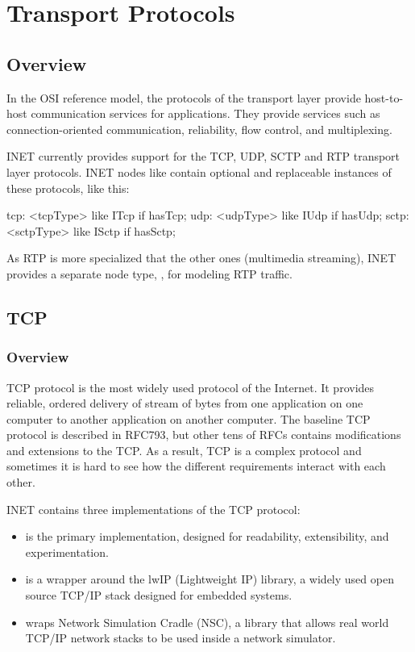 \chapter{Transport Protocols}
\label{cha:transport-protocols}

\section{Overview}
\label{sec:transport:overview}

In the OSI reference model, the protocols of the transport layer provide
host-to-host communication services for applications. They provide services such
as connection-oriented communication, reliability, flow control, and
multiplexing.

INET currently provides support for the TCP, UDP, SCTP and RTP transport layer
protocols. INET nodes like  contain optional and
replaceable instances of these protocols, like this:

\begin{ned}
tcp: <tcpType> like ITcp if hasTcp;
udp: <udpType> like IUdp if hasUdp;
sctp: <sctpType> like ISctp if hasSctp;
\end{ned}

As RTP is more specialized that the other ones (multimedia streaming), INET
provides a separate node type, , for modeling RTP traffic.

\section{TCP}
\label{sec:transport:tcp}

\subsection{Overview}
\label{sec:transport:tcp-overview}

TCP protocol is the most widely used protocol of the Internet. It provides
reliable, ordered delivery of stream of bytes from one application on one
computer to another application on another computer. The baseline TCP protocol
is described in RFC793, but other tens of RFCs contains modifications and
extensions to the TCP. As a result, TCP is a complex protocol and sometimes it
is hard to see how the different requirements interact with each other.

INET contains three implementations of the TCP protocol:

\begin{itemize}
  \item {} is the primary implementation, designed for readability,
    extensibility, and experimentation.
  \item {} is a wrapper around the lwIP (Lightweight IP) library,
    a widely used open source TCP/IP stack designed for embedded systems.
  \item {} wraps Network Simulation Cradle (NSC), a library
    that allows real world TCP/IP network stacks to be used inside a
    network simulator.
\end{itemize}

